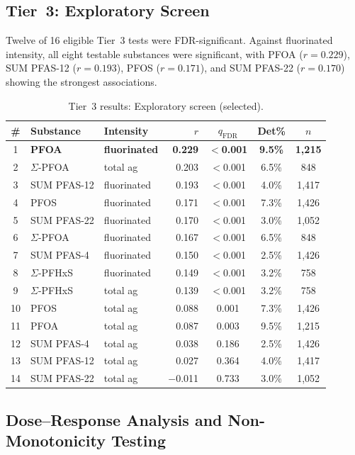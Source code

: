 \documentclass[12pt,a4paper]{article}
\begin{document}
\subsection{Tier~3: Exploratory Screen}

Twelve of 16 eligible Tier~3 tests were FDR-significant. Against fluorinated intensity, all eight testable substances were significant, with PFOA ($r = 0.229$), SUM PFAS-12 ($r = 0.193$), PFOS ($r = 0.171$), and SUM PFAS-22 ($r = 0.170$) showing the strongest associations.

\begin{table}[H]
\centering
\caption{Tier~3 results: Exploratory screen (selected).}
\label{tab:tier3}
\footnotesize
\begin{tabular}{@{}cllrccc@{}}
\toprule
\# & Substance & Intensity & $r$ & $q_{\text{FDR}}$ & Det\% & $n$ \\
\midrule
1 & \textbf{PFOA} & \textbf{fluorinated} & \textbf{0.229} & $\mathbf{<}$\textbf{0.001} & \textbf{9.5\%} & \textbf{1,215} \\
2 & $\Sigma$-PFOA & total ag & 0.203 & $<$0.001 & 6.5\% & 848 \\
3 & SUM PFAS-12 & fluorinated & 0.193 & $<$0.001 & 4.0\% & 1,417 \\
4 & PFOS & fluorinated & 0.171 & $<$0.001 & 7.3\% & 1,426 \\
5 & SUM PFAS-22 & fluorinated & 0.170 & $<$0.001 & 3.0\% & 1,052 \\
6 & $\Sigma$-PFOA & fluorinated & 0.167 & $<$0.001 & 6.5\% & 848 \\
7 & SUM PFAS-4 & fluorinated & 0.150 & $<$0.001 & 2.5\% & 1,426 \\
8 & $\Sigma$-PFHxS & fluorinated & 0.149 & $<$0.001 & 3.2\% & 758 \\
9 & $\Sigma$-PFHxS & total ag & 0.139 & $<$0.001 & 3.2\% & 758 \\
10 & PFOS & total ag & 0.088 & 0.001 & 7.3\% & 1,426 \\
11 & PFOA & total ag & 0.087 & 0.003 & 9.5\% & 1,215 \\
12 & SUM PFAS-4 & total ag & 0.038 & 0.186 & 2.5\% & 1,426 \\
13 & SUM PFAS-12 & total ag & 0.027 & 0.364 & 4.0\% & 1,417 \\
14 & SUM PFAS-22 & total ag & $-$0.011 & 0.733 & 3.0\% & 1,052 \\
\bottomrule
\end{tabular}
\end{table}

\subsection{Dose--Response Analysis and Non-Monotonicity Testing}
\end{document}
